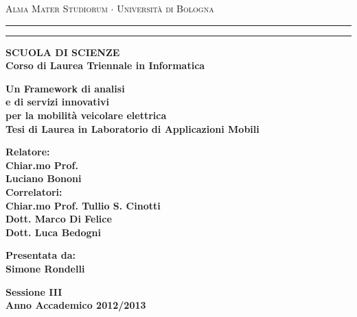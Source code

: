   \begin{titlepage}
    \begin{center}
      {{\Large{\textsc{Alma Mater Studiorum $\cdot$ Universit\`a di Bologna}}}} \rule[0.1cm]{15.8cm}{0.1mm}
      \rule[0.5cm]{15.8cm}{0.6mm}
      {\small{\bf SCUOLA DI SCIENZE\\
      Corso di Laurea Triennale in Informatica }}
    \end{center}
    
    \vspace{15mm}
    
    \begin{center}
      {\LARGE{\bf Un Framework di analisi}}\\
      \vspace{3mm}
      {\LARGE{\bf e di servizi innovativi}}\\
	  \vspace{3mm}
      {\LARGE{\bf per la mobilità veicolare elettrica}}\\
      \vspace{15mm} 
      {\large{\bf Tesi di Laurea in Laboratorio di Applicazioni Mobili}}
    \end{center}
    
    \vspace{25mm}
    \par
    \noindent
    
    \begin{minipage}[t]{0.60\textwidth}
      {\large{\bf Relatore:\\
      Chiar.mo Prof.\\
      Luciano Bononi\newline}}\\
	{\large{\bf Correlatori:\\
	Chiar.mo Prof. Tullio S. Cinotti\\
	Dott. Marco Di Felice\\
	Dott. Luca Bedogni}}
    \end{minipage}
      \hfill
    \begin{minipage}[t]{0.34\textwidth}\raggedleft
    {\large{\bf Presentata da:\\
    Simone Rondelli}}  
    \end{minipage}
   \vspace{13mm}
    \begin{center}
	{\large{\bf Sessione III\\
	Anno Accademico 2012/2013}}
	\end{center}
	\clearpage{\pagestyle{empty}\cleardoublepage}%
  \end{titlepage}
  
